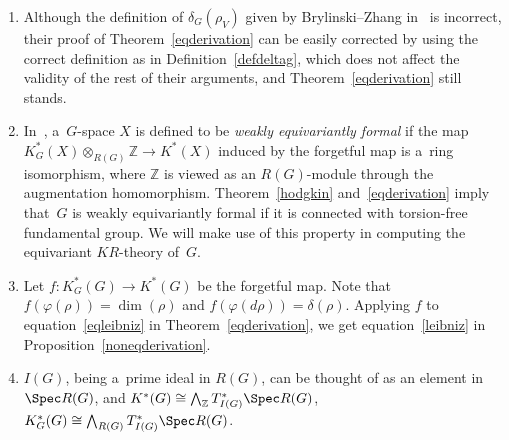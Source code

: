 \begin{Remark}\label{weakequivformality}\quad
\begin{enumerate}\itemsep=0pt
\item
Although the def\/inition of $\delta_G(\rho_V)$ given by Brylinski--Zhang in~\cite{BZ} is incorrect, their proof of
Theorem~\ref{eqderivation} can be easily corrected by using the correct def\/inition as in Def\/inition~\ref{defdeltag},
which does not af\/fect the validity of the rest of their arguments, and Theorem~\ref{eqderivation} still stands.
\item
In~\cite{HL}, a~$G$-space $X$ is def\/ined to be \emph{weakly equivariantly formal} if the map
$K^*_G(X)\otimes_{R(G)}\mathbb{Z}\to K^*(X)$ induced by the forgetful map is a~ring isomorphism, where $\mathbb{Z}$ is
viewed as an $R(G)$-module through the augmentation homomorphism.
Theorem~\ref{hodgkin} and~\ref{eqderivation} imply that~$G$ is weakly equivariantly formal if it is connected with
torsion-free fundamental group.
We will make use of this property in computing the equivariant $KR$-theory of~$G$.
\item
Let $f: K_G^*(G)\to K^*(G)$ be the forgetful map.
Note that $f(\varphi(\rho))=\dim(\rho)$ and $f(\varphi(d\rho))=\delta(\rho)$.
Applying $f$ to equation~\eqref{eqleibniz} in Theorem~\ref{eqderivation}, we get equation~\eqref{leibniz} in
Proposition~\ref{noneqderivation}.
\item
$I(G)$, being a~prime ideal in $R(G)$, can be thought of as an element in $\Spec R(G)$, and
$K^*(G)\cong\bigwedge_{\mathbb{Z}}T^*_{I(G)}\Spec R(G)$, $K_G^*(G)\cong\bigwedge_{R(G)}T^*_{I(G)}\Spec R(G)$.
\end{enumerate}
\end{Remark}
